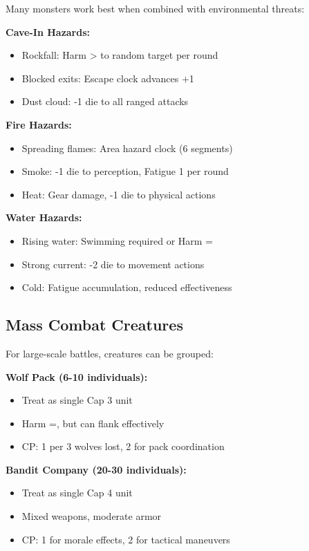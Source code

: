 \documentclass[12pt]{article}
\begin{document}
\begin{itemize}
Many monsters work best when combined with environmental threats:

\textbf{Cave-In Hazards:}
\begin{itemize}
\item Rockfall: Harm > to random target per round
\item Blocked exits: Escape clock advances +1
\item Dust cloud: -1 die to all ranged attacks
\end{itemize}

\textbf{Fire Hazards:}
\begin{itemize}
\item Spreading flames: Area hazard clock (6 segments)
\item Smoke: -1 die to perception, Fatigue 1 per round
\item Heat: Gear damage, -1 die to physical actions
\end{itemize}

\textbf{Water Hazards:}
\begin{itemize}
\item Rising water: Swimming required or Harm =
\item Strong current: -2 die to movement actions
\item Cold: Fatigue accumulation, reduced effectiveness
\end{itemize}

\subsection*{Mass Combat Creatures}

For large-scale battles, creatures can be grouped:

\textbf{Wolf Pack (6-10 individuals):}
\begin{itemize}
\item Treat as single Cap 3 unit
\item Harm =, but can flank effectively
\item CP: 1 per 3 wolves lost, 2 for pack coordination
\end{itemize}

\textbf{Bandit Company (20-30 individuals):}
\begin{itemize}
\item Treat as single Cap 4 unit
\item Mixed weapons, moderate armor
\item CP: 1 for morale effects, 2 for tactical maneuvers
\end{itemize}


\end{itemize}
\end{document}
